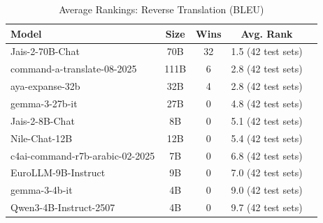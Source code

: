 \begin{table}[htbp]
\centering
\caption{Average Rankings: Reverse Translation (BLEU)}
\label{tab:avg_rankings_bleu}
\begin{tabular}{l@{\hspace{3pt}}c@{\hspace{3pt}}c@{\hspace{3pt}}c@{\hspace{3pt}}c}
\toprule
Model & Size & Wins & Avg. Rank \\
\midrule
Jais-2-70B-Chat & 70B & 32 & 1.5 (42 test sets) \\
command-a-translate-08-2025 & 111B & 6 & 2.8 (42 test sets) \\
aya-expanse-32b & 32B & 4 & 2.8 (42 test sets) \\
gemma-3-27b-it & 27B & 0 & 4.8 (42 test sets) \\
Jais-2-8B-Chat & 8B & 0 & 5.1 (42 test sets) \\
Nile-Chat-12B & 12B & 0 & 5.4 (42 test sets) \\
c4ai-command-r7b-arabic-02-2025 & 7B & 0 & 6.8 (42 test sets) \\
EuroLLM-9B-Instruct & 9B & 0 & 7.0 (42 test sets) \\
gemma-3-4b-it & 4B & 0 & 9.0 (42 test sets) \\
Qwen3-4B-Instruct-2507 & 4B & 0 & 9.7 (42 test sets) \\
\bottomrule
\end{tabular}
\end{table}